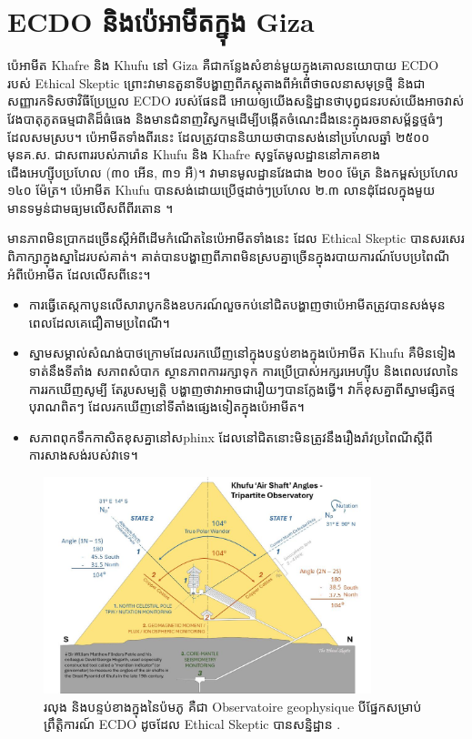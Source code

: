 \documentclass[10pt,twocolumn,letterpaper]{article}
\begin{document}
\section{ECDO និងប៉េអាមីតក្នុង Giza}

ប៉េអាមីត Khafre និង Khufu នៅ Giza គឺជាកន្លែងសំខាន់មួយក្នុងគោលនយោបាយ ECDO របស់ Ethical Skeptic \cite{27} ព្រោះវាមានតួនាទីបង្ហាញពីភស្តុតាងពីអំពើថាចលនាសមុទ្រថ្មី និងជាសញ្ញារកទិសថាវិធីប្រែប្រួល ECDO របស់ផែនដី អោយឲ្យយើងសន្និដ្ឋានថាបុព្វជនរបស់យើងអាចវាស់វែងបាតុភូតធម្មជាតិដ៏ធំធេង និងមានជំនាញវិស្វកម្មដើម្បីបង្កើតចំណេះដឹងនេះក្នុងរចនាសម្ព័ន្ធថ្មធំៗដែលសមស្រប។ ប៉េអាមីតទាំងពីរនេះ ដែលត្រូវបាននិយាយថាបានសង់នៅប្រហែលឆ្នាំ ២៥០០ មុនគ.ស. ជាសពាររបស់ភារ៉ោន Khufu និង Khafre សុទ្ធតែមូលដ្ឋាននៅភាគខាងជើងអេហ្ស៊ីបប្រហែល (៣០ អើន, ៣១ អឺ)។ វាមានមូលដ្ឋានវែងជាង ២០០ ម៉ែត្រ និងកម្ពស់ប្រហែល ១៤០ ម៉ែត្រ។ ប៉េអាមីត Khufu បានសង់ដោយប្រើថ្មដាច់ៗប្រហែល ២.៣ លានដុំដែលក្នុងមួយមានទម្ងន់ជាមធ្យមលើសពីពីរតោន \cite{24, 25}។

មានភាពមិនប្រាកដច្រើនស្ដីអំពីដើមកំណើតនៃប៉េអាមីតទាំងនេះ ដែល Ethical Skeptic បានសរសេរពិភាក្សាក្នុងស្នាដៃរបស់គាត់។ គាត់បានបង្ហាញពីភាពមិនស្របគ្នាច្រើនក្នុងរបាយការណ៍បែបប្រពៃណីអំពីប៉េអាមីត ដែលលើសពីនេះ។

\begin{flushleft}
\begin{itemize}
    \item ការធ្វើតេស្តកាបូនលើសារាបូកនិងឧបករណ៍លួចកប់នៅជិតបង្ហាញថាប៉េអាមីតត្រូវបានសង់មុនពេលដែលគេជឿតាមប្រពៃណី។
    \item ស្នាមសម្គាល់សំណង់បាថក្រោមដែលរកឃើញនៅក្នុងបន្ទប់ខាងក្នុងប៉េអាមីត Khufu គឺមិនទៀងទាត់នឹងទីតាំង សភាពសំបាក ស្ថានភាពការរក្សាទុក ការប្រើប្រាស់អក្សរអេហ្ស៊ីប និងពេលវេលានៃការរកឃើញសូម្បី តែរូបសម្បត្តិ បង្ហាញថាវាអាចជារឿយៗបានក្លែងធ្វើ។ វាក៏ខុសគ្នាពីស្នាមផ្សិតថ្មបុរាណពិតៗ ដែលរកឃើញនៅទីតាំងផ្សេងទៀតក្នុងប៉េអាមីត។
    \item សភាពពុកទឹកកាសិតខុសគ្នានៅសphinx ដែលនៅជិតនោះមិនត្រូវនឹងរឿងរ៉ាវប្រពៃណីស្តីពីការសាងសង់របស់វាទេ។
\end{itemize}
\end{flushleft}

\begin{figure}[b]
\begin{center}
\includegraphics[width=0.85\textwidth]{shafts.jpg}
\end{center}
   \caption{រលុង និងបន្ទប់ខាងក្នុងនៃប៉មភូ គឺជា Observatoire geophysique បីផ្នែកសម្រាប់ព្រឹត្តិការណ៍ ECDO ដូចដែល Ethical Skeptic បានសន្និដ្ឋាន \cite{28}.}
\label{fig:5}
\end{figure}
\end{document}
